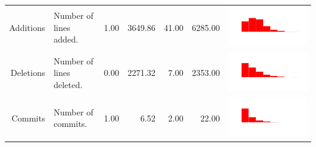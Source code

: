 \documentclass[conference]{IEEEtran}
\begin{document}
\begin{table}[ht]
\begin{tabular}{rp{26em}rrrrc}
    Additions & Number of lines added. & 1.00 & 3649.86 & 41.00 & 6285.00 & \includegraphics[scale = 0.09, clip = true, trim= 50px 60px 50px 60px]{../figs/hist-features/hist-additions.pdf} \\
    Deletions & Number of lines deleted. & 0.00 & 2271.32 & 7.00 & 2353.00 & \includegraphics[scale = 0.09, clip = true, trim= 50px 60px 50px 60px]{../figs/hist-features/hist-deletions.pdf} \\
    Commits & Number of commits. & 1.00 & 6.52 & 2.00 & 22.00 & \includegraphics[scale = 0.09, clip = true, trim= 50px 60px 50px 60px]{../figs/hist-features/hist-commits.pdf} \\

\end{tabular}
\end{table}
\end{document}

